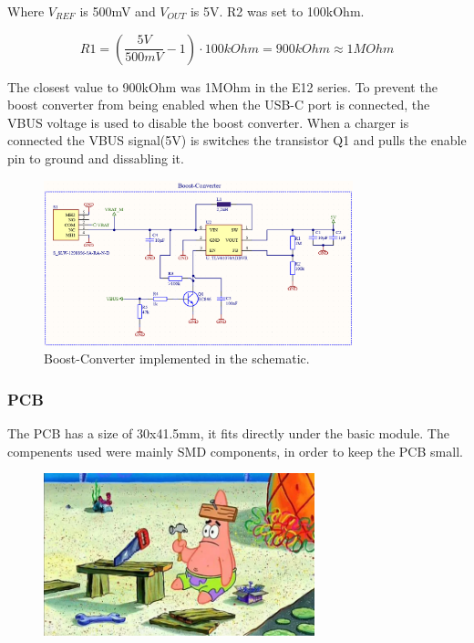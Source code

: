         Where $V_{REF}$ \cite{noauthor_tlv61070apdf_2022} is 500mV and $V_{OUT}$ is 5V. R2 was set to 100kOhm.

        \begin{equation}
            R1 = ( \frac{5V}{500mV} - 1) \cdot 100kOhm = 900kOhm \approx 1MOhm
        \end{equation}

        The closest value to 900kOhm was 1MOhm in the E12 series.
        \newline
        \newline
        To prevent the boost converter from being enabled when the USB-C port is connected, the
        VBUS voltage is used to disable the boost converter. When a charger is connected
        the VBUS signal(5V) is switches the transistor Q1 and pulls the enable pin to ground 
        and dissabling it.
        
        \begin{figure}[H]
        \centering
        \includegraphics[width=0.8\textwidth]{assets/HW/Boost-Converter.png}
        \caption{Boost-Converter implemented in the schematic.}
        \end{figure}

    \subsubsection{PCB}

        The PCB has a size of 30x41.5mm, it fits directly under the basic module. 
        The compenents used were mainly SMD components, in order to keep the PCB small. 

        \begin{figure}[H]
            \centering
            \includegraphics[width=0.7\textwidth]{assets/HW/TBD.png}
        \end{figure}



